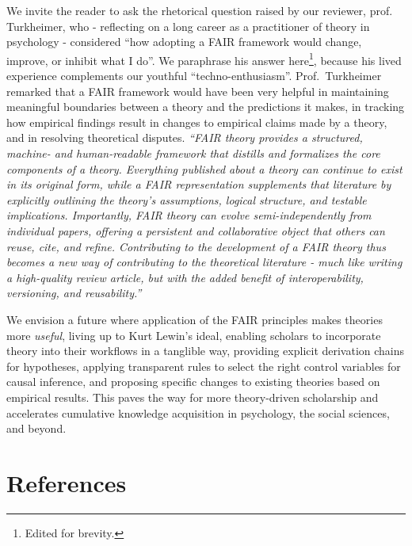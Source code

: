 \documentclass[
  man, noextraspace,floatsintext]{apa7}
\begin{document}
\label{turkheimer}{We invite the reader to ask the rhetorical question raised by our reviewer, prof. Turkheimer, who - reflecting on a long career as a practitioner of theory in psychology - considered ``how adopting a FAIR framework would change, improve, or inhibit what I do''.
We paraphrase his answer here\footnote{Edited for brevity.}, because his lived experience complements our youthful ``techno-enthusiasm''.
Prof.~Turkheimer remarked that a FAIR framework would have been very helpful in maintaining meaningful boundaries between a theory and the predictions it makes,
in tracking how empirical findings result in changes to empirical claims made by a theory,
and in resolving theoretical disputes.
\emph{``FAIR theory provides a structured, machine- and human-readable framework that distills and formalizes the core components of a theory.
Everything published about a theory can continue to exist in its original form,
while a FAIR representation supplements that literature by explicitly outlining the theory's assumptions, logical structure, and testable implications.
Importantly, FAIR theory can evolve semi-independently from individual papers, offering a persistent and collaborative object that others can reuse, cite, and refine.
Contributing to the development of a FAIR theory thus becomes a new way of contributing to the theoretical literature - much like writing a high-quality review article, but with the added benefit of interoperability, versioning, and reusability.''}}

We envision a future where application of the FAIR principles makes theories more \emph{useful}, living up to Kurt Lewin's ideal,
enabling scholars to incorporate theory into their workflows in a tanglible way,
providing explicit derivation chains for hypotheses,
applying transparent rules to select the right control variables for causal inference,
and proposing specific changes to existing theories based on empirical results.
This paves the way for more theory-driven scholarship
and accelerates cumulative knowledge acquisition in psychology, the social sciences, and beyond.

\newpage

\section{References}\label{references}
\end{document}
